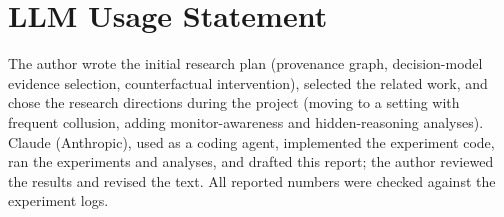 \documentclass[11pt]{article}
\begin{document}
\section{LLM Usage Statement}
The author wrote the initial research plan (provenance graph, decision-model evidence selection, counterfactual
intervention), selected the related work, and chose the research directions during the project (moving to a setting
with frequent collusion, adding monitor-awareness and hidden-reasoning analyses). Claude (Anthropic), used as a coding
agent, implemented the experiment code, ran the experiments and analyses, and drafted this report; the author reviewed
the results and revised the text. All reported numbers were checked against the experiment logs.
\end{document}
